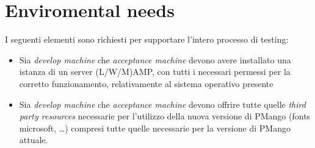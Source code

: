 \section{Enviromental needs}
I seguenti elementi sono richiesti per supportare l'intero processo di testing:
\begin{itemize}
  \item Sia \emph{develop machine} che \emph{acceptance machine} devono avere
  installato una istanza di un server (L/W/M)AMP, con tutti i necessari permessi
  per la corretto funzionamento, relativamente al sistema operativo presente
  \item Sia \emph{develop machine} che \emph{acceptance machine} devono offrire
  tutte quelle \emph{third party resources} necessarie per l'utilizzo della
  nuova versione di PMango (fonts microsoft, \ldots) compresi tutte quelle
  necessarie per la versione di PMango attuale.
\end{itemize}
